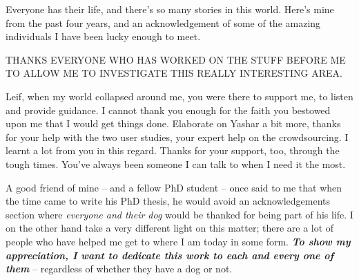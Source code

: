 \begin{preamble}

Everyone has their life, and there's so many stories in this world. Here's mine from the past four years, and an acknowledgement of some of the amazing individuals I have been lucky enough to meet.

THANKS EVERYONE WHO HAS WORKED ON THE STUFF BEFORE ME TO ALLOW ME TO INVESTIGATE THIS REALLY INTERESTING AREA.

Leif, when my world collapsed around me, you were there to support me, to listen and provide guidance. I cannot thank you enough for the faith you bestowed upon me that I would get things done. Elaborate on Yashar a bit more, thanks for your help with the two user studies, your expert help on the crowdsourcing. I learnt a lot from you in this regard. Thanks for your support, too, through the tough times. You've always been someone I can talk to when I need it the most.




A good friend of mine -- and a fellow PhD student -- once said to me that when the time came to write his PhD thesis, he would avoid an acknowledgements section where \emph{everyone and their dog} would be thanked for being part of his life. I on the other hand take a very different light on this matter; there are a lot of people who have helped me get to where I am today in some form. \textbf{\emph{To show my appreciation, I want to dedicate this work to each and every one of them}} -- regardless of whether they have a dog or not.


\end{preamble}
